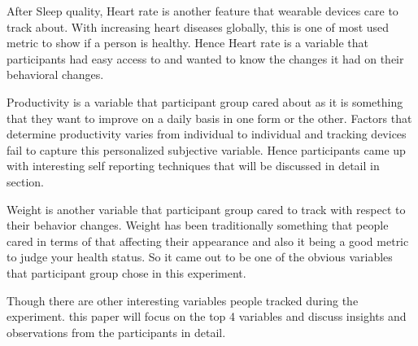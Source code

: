 After Sleep quality, Heart rate is another feature that wearable devices care to track about. With increasing heart diseases globally, this is one of most used metric to show if a person is healthy. Hence Heart rate is a variable that participants had easy access to and wanted to know the changes it had on their behavioral changes.

Productivity is a variable that participant group cared about as it is something that they want to improve on a daily basis in one form or the other. Factors that determine productivity varies from individual to individual and tracking devices fail to capture this personalized subjective variable. Hence participants came up with interesting self reporting techniques that will be discussed in detail in section.

Weight is another variable that participant group cared to track with respect to their behavior changes. Weight has been traditionally something that people cared in terms of that affecting their appearance and also it being a good metric to judge your health status. So it came out to be one of the obvious variables that participant group chose in this experiment. 

Though there are other interesting variables people tracked during the experiment. this paper will focus on the top 4 variables and discuss insights and observations from the participants in detail.

